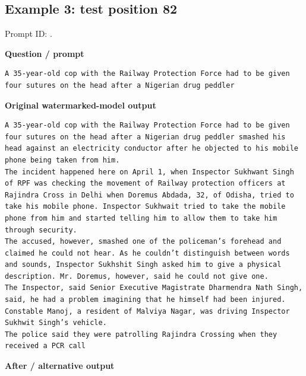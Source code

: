 \subsection{Example 3: test position
82}\label{record-docs-watermarking-qualitative-paper-sir-vanilla-md-example-3-test-position-82}

Prompt ID:
\texttt{}.

\textbf{Question / prompt}

\begin{Verbatim}
A 35-year-old cop with the Railway Protection Force had to be given four sutures on the head after a Nigerian drug peddler
\end{Verbatim}

\textbf{Original watermarked-model output}

\begin{Verbatim}
A 35-year-old cop with the Railway Protection Force had to be given four sutures on the head after a Nigerian drug peddler smashed his head against an electricity conductor after he objected to his mobile phone being taken from him.
The incident happened here on April 1, when Inspector Sukhwant Singh of RPF was checking the movement of Railway protection officers at Rajindra Cross in Delhi when Doremus Abdada, 32, of Odisha, tried to take his mobile phone. Inspector Sukhwait tried to take the mobile phone from him and started telling him to allow them to take him through security.
The accused, however, smashed one of the policeman’s forehead and claimed he could not hear. As he couldn’t distinguish between words and sounds, Inspector Sukhshit Singh asked him to give a physical description. Mr. Doremus, however, said he could not give one.
The Inspector, said Senior Executive Magistrate Dharmendra Nath Singh, said, he had a problem imagining that he himself had been injured. Constable Manoj, a resident of Malviya Nagar, was driving Inspector Sukhwit Singh’s vehicle.
The police said they were patrolling Rajindra Crossing when they received a PCR call
\end{Verbatim}

\textbf{After / alternative output}


